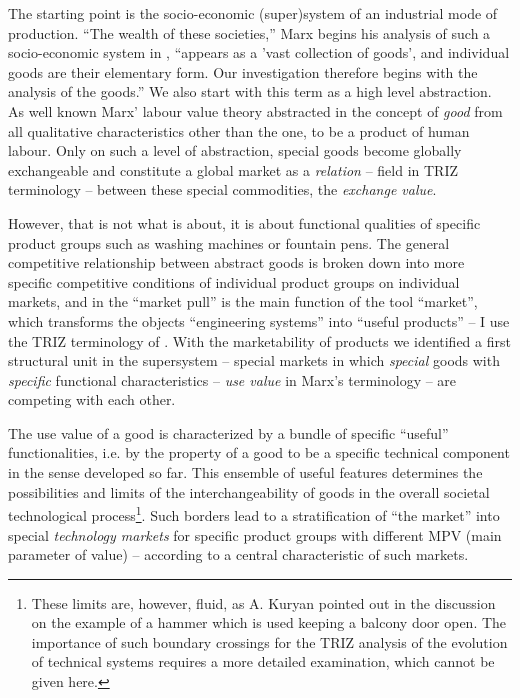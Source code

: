 \documentclass[11pt,a4paper]{article}
\begin{document}
The starting point is the socio-economic (super)system of an industrial mode
of production. ``The wealth of these societies,'' Marx begins his analysis of
such a socio-economic system in \cite{MEW23}, ``appears as a 'vast collection
of goods', and individual goods are their elementary form. Our investigation
therefore begins with the analysis of the goods.''  We also start with this
term as a high level abstraction. As well known Marx' labour value theory
abstracted in the concept of \emph{good} from all qualitative characteristics
other than the one, to be a product of human labour. Only on such a level of
abstraction, special goods become globally exchangeable and constitute a
global market as a \emph{relation} -- field in TRIZ terminology -- between
these special commodities, the \emph{exchange value}.

However, that is not what \cite{TESE2018} is about, it is about functional
qualities of specific product groups such as washing machines or fountain
pens. The general competitive relationship between abstract goods is broken
down into more specific competitive conditions of individual product groups on
individual markets, and in \cite{TESE2018} the ``market pull'' is the main
function of the tool ``market'', which transforms the objects ``engineering
systems'' into ``useful products'' -- I use the TRIZ terminology of \cite{TT}.
With the marketability of products we identified a first structural unit in
the supersystem -- special markets in which \emph{special} goods with
\emph{specific} functional characteristics -- \emph{use value} in Marx's
terminology -- are competing with each other.

The use value of a good is characterized by a bundle of specific ``useful''
functionalities, i.e. by the property of a good to be a specific technical
component in the sense developed so far.  This ensemble of useful features
determines the possibilities and limits of the interchangeability of goods in
the overall societal technological process\footnote{These limits are, however,
  fluid, as A. Kuryan pointed out in the discussion \cite{Graebe2019} on the
  example of a hammer which is used keeping a balcony door open. The
  importance of such boundary crossings for the TRIZ analysis of the evolution
  of technical systems requires a more detailed examination, which cannot be
  given here.}.  Such borders lead to a stratification of ``the market'' into
special \emph{technology markets} for specific product groups with different
MPV (main parameter of value) -- according to \cite{TESE2018} a central
characteristic of such markets.
\end{document}
